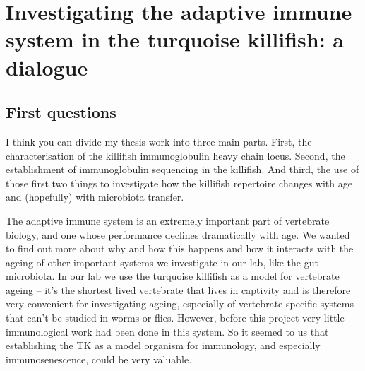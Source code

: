 
\chapter*{Investigating the adaptive immune system in the turquoise killifish: a dialogue}  
\onehalfspacing


%


\section{First questions}


I think you can divide my thesis work into three main parts. First, the characterisation of the killifish immunoglobulin heavy chain locus. Second, the establishment of immunoglobulin sequencing in the killifish. And third, the use of those first two things to investigate how the killifish repertoire changes with age and (hopefully) with microbiota transfer. 


The adaptive immune system is an extremely important part of vertebrate biology, and one whose performance declines dramatically with age. We wanted to find out more about why and how this happens and how it interacts with the ageing of other important systems we investigate in our lab, like the gut microbiota. In our lab we use the turquoise killifish as a model for vertebrate ageing -- it's the shortest lived vertebrate that lives in captivity and is therefore very convenient for investigating ageing, especially of vertebrate-specific systems that can't be studied in worms or flies. However, before this project very little immunological work had been done in this system. So it seemed to us that establishing the TK as a model organism for immunology, and especially immunosenescence, could be very valuable.



